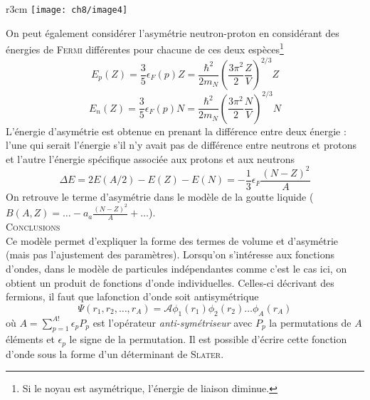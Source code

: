 	\begin{wrapfigure}[8]{r}{3cm}
	\vspace{-5mm}
	\texttt{[image: ch8/image4]}
	\end{wrapfigure}
On peut également considérer l'asymétrie neutron-proton en considérant des énergies de \textsc{Fermi} différentes
pour chacune de ces deux espèces\footnote{Si le noyau est asymétrique, l'énergie de liaison diminue.}
\begin{equation}
E_p(Z) = \frac{3}{5}\epsilon_F(p)Z = \frac{\hbar^2}{2m_N}\left(\frac{3\pi^2}{2}\frac{Z}{V}\right)^{2/3}Z
\end{equation}
\begin{equation}
E_n(Z) = \frac{3}{5}\epsilon_F(p)N = \frac{\hbar^2}{2m_N}\left(\frac{3\pi^2}{2}\frac{N}{V}\right)^{2/3}N
\end{equation}
L'énergie d'asymétrie est obtenue en prenant la différence entre deux énergie : l'une qui serait l'énergie 
s'il n'y avait pas de différence entre neutrons et protons et l'autre l'énergie spécifique associée aux 
protons et aux neutrons
\begin{equation}
\Delta E = 2E(A/2)-E(Z)-E(N) = -\frac{1}{3}\epsilon_F\frac{(N-Z)^2}{A}
\end{equation}
On retrouve le terme d'asymétrie dans le modèle de la goutte liquide ($B(A,Z) = \dots - a_a\frac{(N-Z)^2}{A}+
\dots$).\\

\textsc{Conclusions}\\
Ce modèle permet d'expliquer la forme des termes de volume et d'asymétrie (mais pas l'ajustement des 
paramètres). Lorsqu'on s'intéresse aux fonctions d'ondes, dans le modèle de particules indépendantes comme
c'est le cas ici, on obtient un produit de fonctions d'onde individuelles. Celles-ci décrivant des fermions,
il faut que lafonction d'onde soit antisymétrique
\begin{equation}
\Psi(r_1,r_2,\dots, r_A) =\mathcal{A} \phi_1(r_1)\phi_2(r_2)\dots\phi_A(r_A)
\end{equation}
où $A =\sum_{p=1}^{A!} \epsilon_pP_p$ est l'opérateur \textit{anti-symétriseur} avec $P_p$ la permutations de 
$A$ éléments et $\epsilon_p$ le signe de la permutation. Il est possible d'écrire cette fonction d'onde sous
la forme d'un déterminant de \textsc{Slater}.



